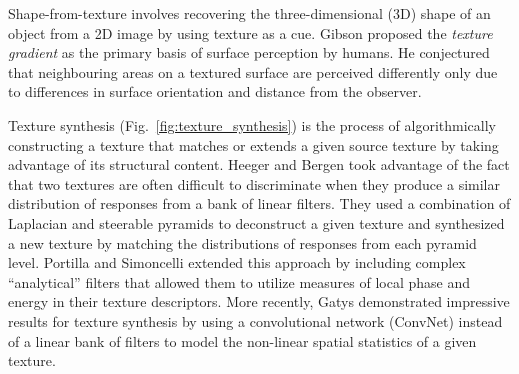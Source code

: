 Shape-from-texture involves recovering the
three-dimensional (3D) shape of an object from a 2D image by using texture as a 
cue. Gibson \cite{gibson1950perception} proposed the \emph{texture gradient} as 
the primary basis of surface perception by humans. He conjectured that neighbouring areas on a textured surface are perceived differently only due to differences
in surface orientation and distance from the observer.




Texture synthesis (Fig.\ \ref{fig:texture_synthesis}) is the process of algorithmically constructing a texture that
matches or extends a given source texture by taking advantage of its structural 
content. Heeger and Bergen \cite{heeger1995pyramid} took advantage of the fact 
that two textures are often difficult to discriminate when they produce a similar 
distribution of responses from a bank of linear filters. They used a combination 
of Laplacian and steerable pyramids to deconstruct a given texture and 
synthesized a new texture by matching the distributions of responses from each
pyramid level. Portilla and Simoncelli \cite{portilla2000parametric} extended this approach by including complex ``analytical'' filters that allowed them to utilize measures of local phase and energy in their texture descriptors. More recently, Gatys \etal \cite{gatys2015} demonstrated 
impressive results for texture synthesis by using a convolutional network (ConvNet) instead of a linear 
bank of filters to model the non-linear spatial statistics of a given texture.



